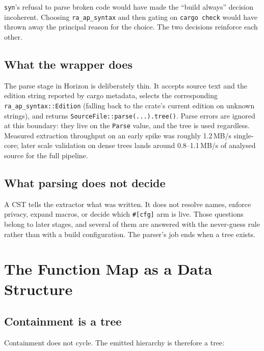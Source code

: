\documentclass[11pt,a4paper,oneside]{report}
\newcommand{\horizon}{Horizon}
\begin{document}
\texttt{syn}'s refusal to parse broken code would have made the ``build
always'' decision incoherent. Choosing \texttt{ra\_ap\_syntax} and then
gating on \texttt{cargo check} would have thrown away the principal reason
for the choice. The two decisions reinforce each other.

\section{What the wrapper does}

The parse stage in \horizon{} is deliberately thin. It accepts source text
and the edition string reported by cargo metadata, selects the corresponding
\texttt{ra\_ap\_syntax::Edition} (falling back to the crate's current edition
on unknown strings), and returns \texttt{SourceFile::parse(...).tree()}.
Parse errors are ignored at this boundary: they live on the \texttt{Parse}
value, and the tree is used regardless. Measured extraction throughput on an
early spike was roughly 1.2\,MB/s single-core; later scale validation on dense
trees lands around 0.8--1.1\,MB/s of analysed source for the full pipeline.

\section{What parsing does not decide}

A CST tells the extractor what was written. It does not resolve names, enforce
privacy, expand macros, or decide which \texttt{\#[cfg]} arm is live. Those
questions belong to later stages, and several of them are answered with the
never-guess rule rather than with a build configuration. The parser's job ends
when a tree exists.

\chapter{The Function Map as a Data Structure}
\label{ch:model}

\section{Containment is a tree}

Containment does not cycle. The emitted hierarchy is therefore a tree:
\end{document}
